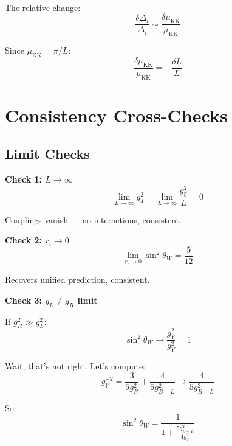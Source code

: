 \documentclass[11pt,a4paper]{article}
\begin{document}
The relative change:
\begin{equation}
\label{eq:threshold-rel-change}
\frac{\delta\Delta_i}{\Delta_i} \sim \frac{\delta\mu_{\text{KK}}}{\mu_{\text{KK}}}
\end{equation}

Since $\mu_{\text{KK}} = \pi/L$:
\begin{equation}
\label{eq:mu-kk-from-L}
\frac{\delta\mu_{\text{KK}}}{\mu_{\text{KK}}} = -\frac{\delta L}{L}
\end{equation}

\section{Consistency Cross-Checks}
\label{sec:crosschecks}

\subsection{Limit Checks}
\label{subsec:limit-checks}

\textbf{Check 1: $L \to \infty$}
\begin{equation}
\label{eq:limit-L-inf}
\lim_{L\to\infty} g_4^2 = \lim_{L\to\infty}\frac{g_5^2}{L} = 0
\end{equation}

Couplings vanish — no interactions, consistent.

\textbf{Check 2: $r_i \to 0$}
\begin{equation}
\label{eq:limit-ri-zero}
\lim_{r_i\to 0}\sin^2\theta_W = \frac{5}{12}
\end{equation}

Recovers unified prediction, consistent.

\textbf{Check 3: $g_L \neq g_R$ limit}

If $g_R^2 \gg g_L^2$:
\begin{equation}
\label{eq:limit-gR-large}
\sin^2\theta_W \to \frac{g_Y^2}{g_Y^2} = 1
\end{equation}

Wait, that's not right. Let's compute:
\begin{equation}
\label{eq:gR-large-gY}
g_Y^{-2} = \frac{3}{5g_R^2} + \frac{4}{5g_{B-L}^2} \to \frac{4}{5g_{B-L}^2}
\end{equation}

So:
\begin{equation}
\label{eq:sin2-gR-large}
\sin^2\theta_W = \frac{1}{1 + \frac{5g_{B-L}^2}{4g_L^2}}
\end{equation}
\end{document}
